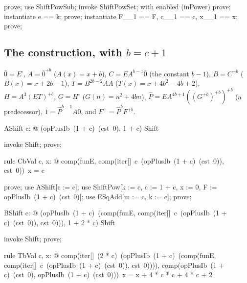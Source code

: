 \documentclass{article}
\begin{document}
\begin{zproof}
prove;
use ShiftPowSub;
invoke ShiftPowSet;
with enabled (inPower) prove;
instantiate e == k;
prove;
instantiate F\_\_1 == F, c\_\_1 == c, x\_\_1 == x;
prove;
\end{zproof}

\subsection{The construction, with $b = c + 1$}

$\bar 0 = E^\square$, $A = \bar 0^{+b}$ ($A(x) = x + b$), $C = E A^{b-1} \bar 0$ (the constant $b - 1$),
$B = C^{+b}$ ($B(x) = x + 2b - 1$), $T = B^{2b-2} A A$ ($T(x) = x + 4b^2 - 4b + 2$),
$H = A^3 (E T)^{+b}$, $G = H^\square$ ($G(n) = n^2 + 4bn$),
$\hat P = E A^{4b+1} ((G^{+b})^{+b})^{+b}$ (a predecessor), $\bar 1 = \hat P^{b-1} A \bar 0$, and
$F^+ = \hat P^b F^{+b}$.

\begin{theorem}{AShift}
  \forall c: \nat @ (opPlusIb~(1 + c)~(cst~0), 1 + c) \in Shift
\end{theorem}

\begin{zproof}
invoke Shift;
prove;
\end{zproof}

\begin{theorem}{rule CbVal}
  \forall c, x: \nat @ comp(funE, comp(iter[\nat]~c~(opPlusIb~(1 + c)~(cst~0)), cst~0))~x = c
\end{theorem}

\begin{zproof}
prove;
use AShift[c := c];
use ShiftPow[k := c, c := 1 + c, x := 0, F := opPlusIb~(1 + c)~(cst~0)];
use ESqAdd[m := c, k := c];
prove;
\end{zproof}

\begin{theorem}{BShift}
  \forall c: \nat @ (opPlusIb~(1 + c)~(comp(funE, comp(iter[\nat]~c~(opPlusIb~(1 + c)~(cst~0)), cst~0))), 1 + 2 * c) \in Shift
\end{theorem}

\begin{zproof}
invoke Shift;
prove;
\end{zproof}

\begin{theorem}{rule TbVal}
  \forall c, x: \nat @ comp(iter[\nat]~(2 * c)~(opPlusIb~(1 + c)~(comp(funE, comp(iter[\nat]~c~(opPlusIb~(1 + c)~(cst~0)), cst~0)))), comp(opPlusIb~(1 + c)~(cst~0), opPlusIb~(1 + c)~(cst~0)))~x = x + 4 * c * c + 4 * c + 2
\end{theorem}
\end{document}
